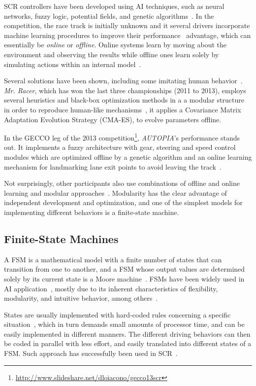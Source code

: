 SCR controllers have been developed using AI techniques, such as neural networks, fuzzy logic, potential fields, and genetic algorithms~\cite{Loiacono:2012:LEA:2212908.2212953}. In the competition, the race track is initially unknown and it several drivers incorporate machine learning procedures to improve their performance~\cite{2009} advantage, which can essentially be \emph{online} or \emph{offline}. Online systems learn by moving about the environment and observing the results while offline ones learn solely by simulating actions within an internal model~\cite{mitchell_1997}.

Several solutions have been shown, including some imitating human behavior~\cite{Exp,5593318}. \emph{Mr. Racer}, which has won the last three championships (2011 to 2013), employs several heuristics and black-box optimization methods in a a modular structure in order to reproduce human-like mechanisms~\cite{MrRacer}, it applies a Covariance Matrix Adaptation Evolution Strategy (CMA-ES), to evolve parameters offline.

In the GECCO leg of the 2013 competition\footnote{\url{http://www.slideshare.net/dloiacono/gecco13scr}}, \emph{AUTOPIA}'s performance stands out. It implements a fuzzy architecture with gear, steering and speed control modules which are optimized offline by a genetic algorithm and an online learning mechanism for landmarking lane exit points to avoid leaving the track~\cite{AUTOPIA}.

Not surprisingly, other participants also use combinations of offline and online learning and modular approaches~\cite{2009,DIEGO,Exp}. Modularity has the clear advantage of independent development and optimization\cite{MrRacer,AUTOPIA2009}, and one of the simplest models for implementing different behaviors is a finite-state machine.

\subsection{Finite-State Machines}%
A FSM is a mathematical model with a finite number of states that can transition from one to another, and a FSM whose output values are determined solely by its current state is a Moore machine~\cite{Ajzerman}. FSMs have been widely used in AI application~\cite{Millington:2006:FSM}, mostly due to its inherent characteristics of flexibility, modularity, and intuitive behavior, among others~\cite{Buckland:2005:AI}.

States are usually implemented with hard-coded rules concerning a specific situation~\cite{Buckland:2005:AI}, which in turn demands small amounts of processor time, and can be easily implemented in different manners. The different driving behaviors can then be coded in parallel with less effort, and easily translated into different states of a FSM. Such approach has successfully been used in SCR~\cite{2009,DIEGO}.

